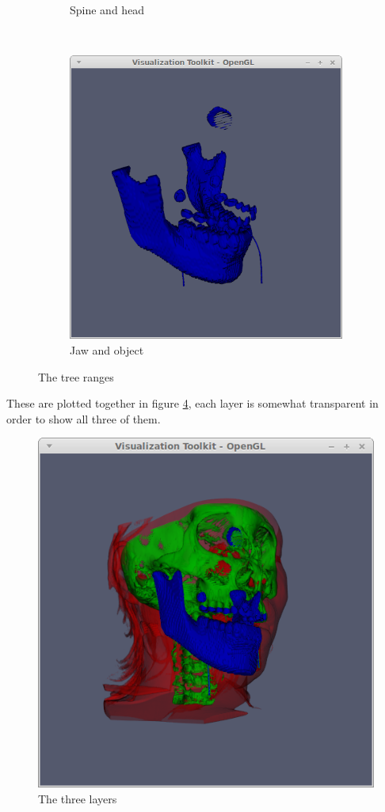 \documentclass{article}[10pt]
\begin{document}
\begin{figure}[h]
\begin{subfigure}[b]{0.3\textwidth}
		\caption{Spine and head}
		\label{fig:green}
	\end{subfigure}~
	\begin{subfigure}[b]{0.3\textwidth}
		\includegraphics[width=\textwidth]{blue}
		\caption{Jaw and object}
		\label{fig:blue}
	\end{subfigure}
	\caption{The tree ranges}\label{fig:animals}
\end{figure}

These are plotted together in figure \ref{fig:rgb}, each layer is somewhat
transparent in order to show all three of them.

\begin{figure}[h]
	\centering
    \includegraphics[width=.9\textwidth]{rgb}
    \caption{The three layers}
    \label{fig:rgb}
\end{figure}
\end{document}

